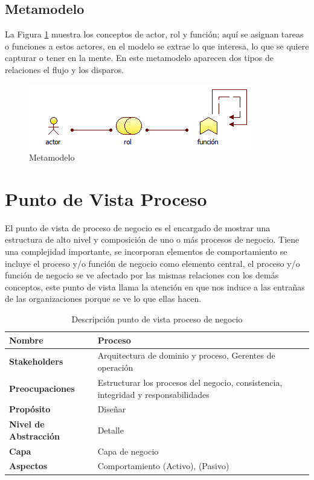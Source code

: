      \subsection{Metamodelo}
      La Figura \ref{metamodelo3} muestra los conceptos de actor, rol y función; aquí se asignan tareas o funciones a estos actores, en el modelo se extrae lo que interesa, lo que se quiere capturar o tener en la mente. En este metamodelo aparecen dos tipos de relaciones el flujo y los disparos. \cite{ref9}

      \begin{figure}[h]
      	\centering
      	\includegraphics{Imagenes/Metamodelos/03.png}
      	\caption{Metamodelo}
      	\label{metamodelo3}
      \end{figure}

      \section{Punto de Vista Proceso}
      El punto de vista de proceso de negocio es el encargado de mostrar una estructura de alto nivel y composición de uno o más procesos de negocio. Tiene una complejidad importante, se incorporan elementos de comportamiento se incluye el proceso y/o función de negocio como elemento central, el proceso y/o función de negocio se ve afectado por las mismas relaciones con los demás conceptos, este punto de vista llama la atención en que nos induce a las entrañas de las organizaciones porque se ve lo que ellas hacen. \cite{ref9}

      \begin{table}[h]
      	\centering
      	\begin{tabular}{p{3.7cm}p{8cm}}
      		\hline
      		\textbf{Nombre} & \textbf{Proceso} \\
      		\hline
      		\textbf{Stakeholders} & Arquitectura de dominio y proceso, Gerentes de operación \\
      		\textbf{Preocupaciones} & Estructurar los procesos del negocio, consistencia, integridad y responsabilidades \\
      		\textbf{Propósito} & Diseñar \\
      		\textbf{Nivel de Abstracción} & Detalle \\
      		\textbf{Capa} & Capa de negocio \\
      		\textbf{Aspectos} & Comportamiento (Activo), (Pasivo) \\
      	\end{tabular}
      	\caption{Descripción punto de vista proceso de negocio \cite{ref9}}
      	\label{Tab:tabla7}
      \end{table}

